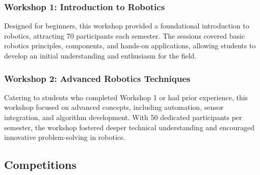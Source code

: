 \documentclass[a4paper,12pt]{article}
\begin{document}
\newpage
\subsubsection{Workshop 1: Introduction to Robotics}
Designed for beginners, this workshop provided a foundational introduction to robotics, attracting 70 participants each semester. The sessions covered basic robotics principles, components, and hands-on applications, allowing students to develop an initial understanding and enthusiasm for the field.



\subsubsection{Workshop 2: Advanced Robotics Techniques}
Catering to students who completed Workshop 1 or had prior experience, this workshop focused on advanced concepts, including automation, sensor integration, and algorithm development. With 50 dedicated participants per semester, the workshop fostered deeper technical understanding and encouraged innovative problem-solving in robotics. 

\subsection{Competitions} 
\end{document}
